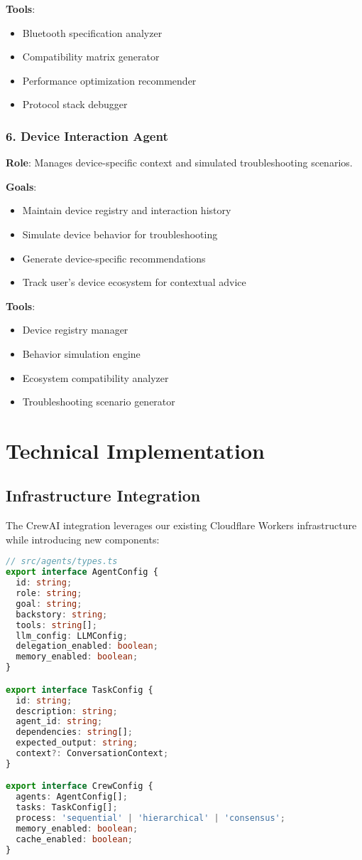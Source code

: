 \documentclass[11pt, a4paper]{article}
\begin{document}
\textbf{Tools}:
\begin{itemize}
    \item Bluetooth specification analyzer
    \item Compatibility matrix generator
    \item Performance optimization recommender
    \item Protocol stack debugger
\end{itemize}

\subsubsection{6. Device Interaction Agent}
\textbf{Role}: Manages device-specific context and simulated troubleshooting scenarios.

\textbf{Goals}:
\begin{itemize}
    \item Maintain device registry and interaction history
    \item Simulate device behavior for troubleshooting
    \item Generate device-specific recommendations
    \item Track user's device ecosystem for contextual advice
\end{itemize}

\textbf{Tools}:
\begin{itemize}
    \item Device registry manager
    \item Behavior simulation engine
    \item Ecosystem compatibility analyzer
    \item Troubleshooting scenario generator
\end{itemize}

\section{Technical Implementation}

\subsection{Infrastructure Integration}

The CrewAI integration leverages our existing Cloudflare Workers infrastructure while introducing new components:

\begin{lstlisting}[language=TypeScript, caption=CrewAI Agent Interface Definition]
// src/agents/types.ts
export interface AgentConfig {
  id: string;
  role: string;
  goal: string;
  backstory: string;
  tools: string[];
  llm_config: LLMConfig;
  delegation_enabled: boolean;
  memory_enabled: boolean;
}

export interface TaskConfig {
  id: string;
  description: string;
  agent_id: string;
  dependencies: string[];
  expected_output: string;
  context?: ConversationContext;
}

export interface CrewConfig {
  agents: AgentConfig[];
  tasks: TaskConfig[];
  process: 'sequential' | 'hierarchical' | 'consensus';
  memory_enabled: boolean;
  cache_enabled: boolean;
}
\end{lstlisting}
\end{document}
